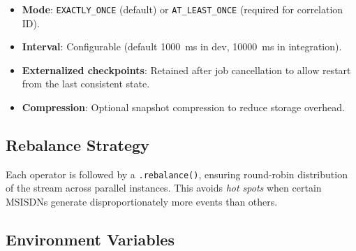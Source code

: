 \begin{itemize}
    \item \textbf{Mode}: \texttt{EXACTLY\_ONCE} (default) or \texttt{AT\_LEAST\_ONCE} (required for correlation ID).
    \item \textbf{Interval}: Configurable (default 1000~ms in dev, 10000~ms in integration).
    \item \textbf{Externalized checkpoints}: Retained after job cancellation to allow restart from the last consistent state.
    \item \textbf{Compression}: Optional snapshot compression to reduce storage overhead.
\end{itemize}

\subsection{Rebalance Strategy}

Each operator is followed by a \texttt{.rebalance()}, ensuring round-robin distribution of the stream across parallel instances. This avoids \textit{hot spots} when certain MSISDNs generate disproportionately more events than others.

\subsection{Environment Variables}


